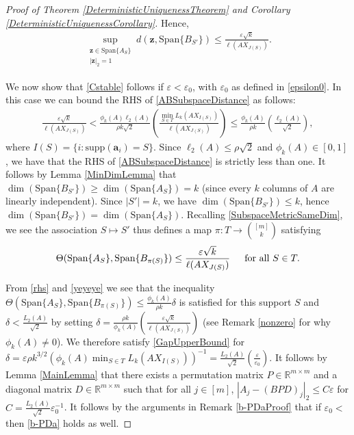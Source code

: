 \documentclass[journal, onecolumn]{IEEEtran}
\begin{document}
\begin{proof}[Proof of Theorem \ref{DeterministicUniquenessTheorem} and Corollary \ref{DeterministicUniquenessCorollary}]
Hence,
\begin{align}\label{ABSubspaceDistance}
\sup_{ \substack{ \mathbf{z} \in \text{Span}\{A_{S}\} \\ |\mathbf{z}|_2 = 1} } d(\mathbf{z}, \text{Span}\{B_{S'}\}) \leq \frac{\varepsilon\sqrt{k}}{\ell(AX_{J(S)})}.
\end{align}

We now show that \eqref{Cstable} follows if $\varepsilon < \varepsilon_0$, with $\varepsilon_0$ as defined in \eqref{epsilon0}. In this case we can bound the RHS of \eqref {ABSubspaceDistance} as follows: 
\begin{align}\label{rhs}
\frac{\varepsilon\sqrt{k}}{\ell(AX_{J(S)})} 
<  \frac{\phi_k(A) \ell_2(A)}{\rho k \sqrt{2}} \left( \frac{\min_{S \in T}L_k(AX_{I(S)})}{\ell(AX_{J(S)})} \right)
\leq \frac{\phi_k(A)}{\rho k} \left( \frac{\ell_2(A)}{\sqrt{2}} \right),
\end{align}
%
where $I(S) = \{i: \text{supp}(\mathbf{a}_i)=S\}$. Since $\ell_2(A) \leq \rho \sqrt{2}$ and $\phi_k(A) \in [0,1]$, we have that the RHS of \eqref{ABSubspaceDistance} is strictly less than one. It follows by Lemma \ref{MinDimLemma} that $\dim(\text{Span}\{B_{S'}\}) \geq \dim(\text{Span}\{A_{S}\}) = k$ (since every $k$ columns of $A$ are linearly independent). Since $|S'| = k$, we have $\dim(\text{Span}\{B_{S'}\}) \leq k$, hence $\dim(\text{Span}\{B_{S'}\}) = \dim(\text{Span}\{A_{S}\})$. Recalling \eqref{SubspaceMetricSameDim},  we see the association $S \mapsto S'$ thus defines a map $\pi: T \to {[m] \choose k}$ satisfying
\begin{align}\label{yeyeye}
\Theta(\text{Span}\{A_{S}\}, \text{Span}\{B_{\pi(S)}\}) \leq \frac{\varepsilon\sqrt{k}}{\ell(AX_{J(S)})} \indent \text{for all } S \in T.
\end{align}

From \eqref{rhs} and \eqref{yeyeye} we see that the inequality $\Theta(\text{Span}\{A_{S}\}, \text{Span}\{B_{\pi(S)}\}) \leq \frac{ \phi_k(A) }{\rho k} \delta$ is satisfied for this support $S$ and $\delta < \frac{L_2(A)}{\sqrt{2}}$ by setting $\delta = \frac{ \rho k}{ \phi_k(A) } \left(  \frac{\varepsilon \sqrt{k}}{\ell(AX_{J(S)})} \right)$ (see Remark \ref{nonzero} for why $\phi_k(A) \neq 0$). We therefore satisfy \eqref{GapUpperBound} for $\delta = \varepsilon \rho k^{3/2}(\phi_k(A) \min_{S \in T} L_k(AX_{I(S)}))^{-1} =  \frac{L_{2}(A)}{\sqrt{2}} \left( \frac{\varepsilon }{\varepsilon_0} \right)$. It follows by Lemma \ref{MainLemma} that there exists a permutation matrix $P \in \mathbb{R}^{m \times m}$ and a diagonal matrix $D \in \mathbb{R}^{m \times m}$ such that for all $j \in [m]$,
$|A_j - (BPD)_j|_2 \leq C\varepsilon$ for $C = \frac{ L_{2}(A)}{\sqrt{2}} \varepsilon_0 ^{-1} $. It follows by the arguments in Remark \ref{b-PDaProof} that if $\varepsilon_0 <$ then \eqref{b-PDa} holds as well.
\end{proof}
\end{document}
